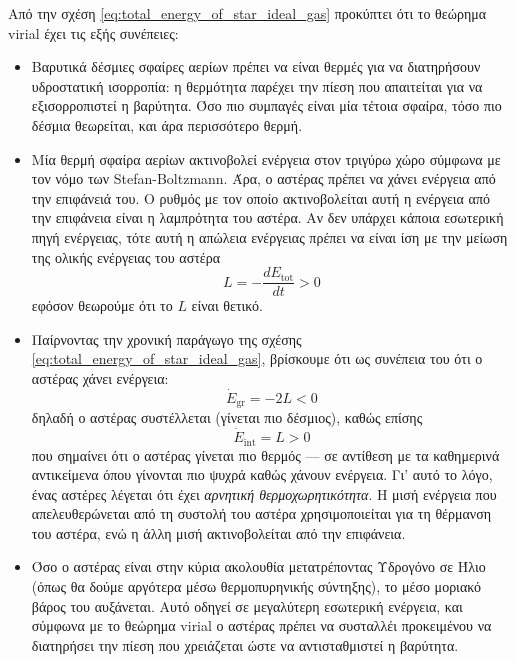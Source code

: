 Από την σχέση \eqref{eq:total_energy_of_star_ideal_gas} προκύπτει ότι το θεώρημα virial έχει τις εξής συνέπειες:

\begin{itemize}
    \item Βαρυτικά δέσμιες σφαίρες αερίων πρέπει να είναι θερμές για να διατηρήσουν υδροστατική ισορροπία: η θερμότητα παρέχει την πίεση που απαιτείται για να εξισορροπιστεί η βαρύτητα. Όσο πιο συμπαγές είναι μία τέτοια σφαίρα, τόσο πιο δέσμια θεωρείται, και άρα περισσότερο θερμή.
    
    \item Μία θερμή σφαίρα αερίων ακτινοβολεί ενέργεια στον τριγύρω χώρο σύμφωνα με τον νόμο των Stefan-Boltzmann. Άρα, ο αστέρας πρέπει να χάνει ενέργεια από την επιφάνειά του. Ο ρυθμός με τον οποίο ακτινοβολείται αυτή η ενέργεια από την επιφάνεια είναι η λαμπρότητα του αστέρα. Αν δεν υπάρχει κάποια εσωτερική πηγή ενέργειας, τότε αυτή η απώλεια ενέργειας πρέπει να είναι ίση με την μείωση της ολικής ενέργειας του αστέρα
    \begin{equation}
        L = - \frac{dE_{\text{tot}}}{dt} > 0
    \end{equation}
    εφόσον θεωρούμε ότι το $L$ είναι θετικό.
    
    \item Παίρνοντας την χρονική παράγωγο της σχέσης \eqref{eq:total_energy_of_star_ideal_gas}, βρίσκουμε ότι ως συνέπεια του ότι ο αστέρας χάνει ενέργεια:
    \begin{equation}
        \Dot{E}_{\text{gr}} = - 2L < 0    
    \end{equation}
    δηλαδή ο αστέρας συστέλλεται (γίνεται πιο δέσμιος), καθώς επίσης
    \begin{equation}
        \Dot{E}_{\text{int}} = L > 0
    \end{equation}
    που σημαίνει ότι ο αστέρας γίνεται πιο θερμός --- σε αντίθεση με τα καθημερινά αντικείμενα όπου γίνονται πιο ψυχρά καθώς χάνουν ενέργεια. Γι' αυτό το λόγο, ένας αστέρες λέγεται ότι έχει \textit{αρνητική θερμοχωρητικότητα}. Η μισή ενέργεια που απελευθερώνεται από τη συστολή του αστέρα χρησιμοποιείται για τη θέρμανση του αστέρα, ενώ η άλλη μισή ακτινοβολείται από την επιφάνεια.
    
    \item Όσο ο αστέρας είναι στην κύρια ακολουθία μετατρέποντας Υδρογόνο σε Ήλιο (όπως θα δούμε αργότερα μέσω θερμοπυρηνικής σύντηξης), το μέσο μοριακό βάρος του αυξάνεται. Αυτό οδηγεί σε μεγαλύτερη εσωτερική ενέργεια, και σύμφωνα με το θεώρημα virial ο αστέρας πρέπει να συσταλλέι προκειμένου να διατηρήσει την πίεση που χρειάζεται ώστε να αντισταθμιστεί η βαρύτητα.
\end{itemize}

